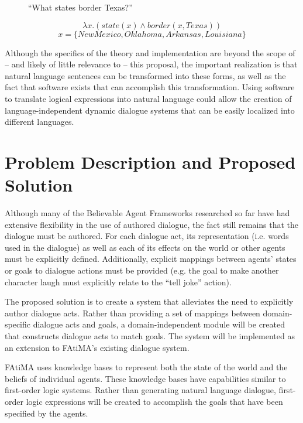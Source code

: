 \documentclass{article}
\begin{document}
\begin{figure}[htbp!]
\begin{center}
{
\center ``What states border Texas?''}

\[
 \lambda x.(state(x) \wedge  border(x,Texas))
\]
\[
 x = \{NewMexico, Oklahoma, Arkansas, Louisiana\}
\]

\end{center}
\end{figure}

Although the specifics of the theory and implementation are beyond the
scope of -- and likely of little relevance to -- this proposal, the
important realization is that natural language sentences can be
transformed into these forms, as well as the fact that software exists
that can accomplish this transformation\cite{White2011}.
Using software to translate logical expressions into natural language
could allow the creation of language-independent dynamic dialogue
systems that can be easily localized into different languages.


\section{Problem Description and Proposed Solution}

Although many of the Believable Agent Frameworks researched so far
have had extensive flexibility in the use of authored dialogue, the
fact still remains that the dialogue must be authored.  For each
dialogue act, its representation (i.e. words used in the dialogue) as well as
each of its effects on the world or other agents must be explicitly
defined.  Additionally, explicit mappings between agents' states or
goals to dialogue actions must be provided (e.g. the goal to make
another character laugh must explicitly relate to the ``tell joke''
action).

The proposed solution is to create a system that alleviates the need
to explicitly author dialogue acts.  Rather than providing a set of
mappings between domain-specific dialogue acts and goals, a
domain-independent module will be created that constructs dialogue
acts to match goals.  The system will be implemented as an extension
to FAtiMA's existing dialogue system.

FAtiMA uses knowledge bases to represent both the state of the world
and the beliefs of individual agents.  These knowledge bases have
capabilities similar to first-order logic systems.  Rather than
generating natural language dialogue, first-order logic expressions
will be created to accomplish the goals that have been specified by
the agents.
\end{document}
